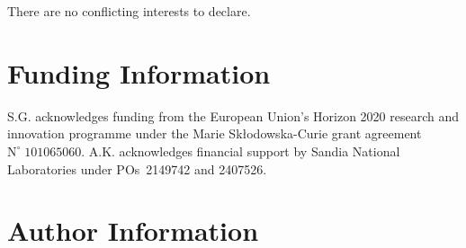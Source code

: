 \documentclass[9pt,tutorial]{livecoms}
\begin{document}
There are no conflicting interests to declare.

\section*{Funding Information}

S.G. acknowledges funding from the European Union's Horizon 2020 research and
innovation programme under the Marie Skłodowska-Curie grant agreement $\text{N}^\circ\;101065060$.
A.K. acknowledges financial support by Sandia National Laboratories under
POs~2149742 and 2407526.

\section*{Author Information}
\makeorcid



\end{document}

